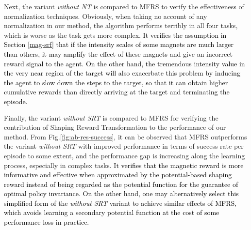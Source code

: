 \documentclass[journal]{IEEEtran}
\begin{document}
Next, the variant \textit{without NT} is compared to MFRS to verify the effectiveness of normalization techniques.
Obviously, when taking no account of any normalization in our method, the algorithm performs terribly in all four tasks, which is worse as the task gets more complex.
\textcolor{black}{It verifies the assumption in Section \ref{mag-srf} that if the intensity scales of some magnets are much larger than others, it may amplify the effect of these magnets and give an incorrect reward signal to the agent.
On the other hand, the tremendous intensity value in the very near region of the target will also exacerbate this problem by inducing the agent to slow down the steps to the target, so that it can obtain higher cumulative rewards than directly arriving at the target and terminating the episode.}

Finally, the variant \textit{without SRT} is compared to MFRS for verifying the contribution of Shaping Reward Transformation to the performance of our method.
From Fig.\ref{fig:ab-res-success}, it can be observed that 
MFRS outperforms the variant \textit{without SRT} with improved performance in terms of success rate per episode to some extent, and the performance gap is increasing along the learning process, especially in complex tasks.
\textcolor{black}{It verifies that the magnetic reward is more informative and effective when approximated by the potential-based shaping reward instead of being regarded as the potential function for the guarantee of optimal policy invariance.
On the other hand, one may alternatively select this simplified form of the \textit{without SRT} variant to achieve similar effects of MFRS, which avoids learning a secondary potential function at the cost of some performance loss in practice.}
\end{document}
